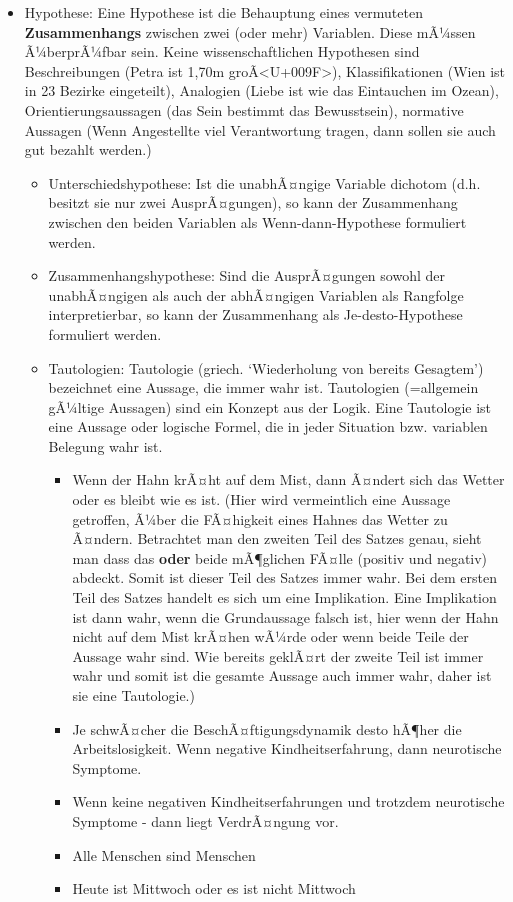 \documentclass[
]{book}
\providecommand{\tightlist}{%
  \setlength{\itemsep}{0pt}\setlength{\parskip}{0pt}}
\begin{document}
\begin{itemize}
\tightlist
\item
  Hypothese: Eine Hypothese ist die Behauptung eines vermuteten \textbf{Zusammenhangs} zwischen zwei (oder mehr) Variablen. Diese mÃ¼ssen Ã¼berprÃ¼fbar sein. Keine wissenschaftlichen Hypothesen sind Beschreibungen (Petra ist 1,70m groÃ\textless U+009F\textgreater), Klassifikationen (Wien ist in 23 Bezirke eingeteilt), Analogien (Liebe ist wie das Eintauchen im Ozean), Orientierungsaussagen (das Sein bestimmt das Bewusstsein), normative Aussagen (Wenn Angestellte viel Verantwortung tragen, dann sollen sie auch gut bezahlt werden.)

  \begin{itemize}
  \tightlist
  \item
    Unterschiedshypothese: Ist die unabhÃ¤ngige Variable dichotom (d.h. besitzt sie nur zwei AusprÃ¤gungen), so kann der Zusammenhang zwischen den beiden Variablen als Wenn-dann-Hypothese formuliert werden.
  \item
    Zusammenhangshypothese: Sind die AusprÃ¤gungen sowohl der unabhÃ¤ngigen als auch der abhÃ¤ngigen Variablen als Rangfolge interpretierbar, so kann der Zusammenhang als Je-desto-Hypothese formuliert werden.
  \item
    Tautologien: Tautologie (griech. `Wiederholung von bereits Gesagtem') bezeichnet eine Aussage, die immer wahr ist. Tautologien (=allgemein gÃ¼ltige Aussagen) sind ein Konzept aus der Logik. Eine Tautologie ist eine Aussage oder logische Formel, die in jeder Situation bzw. variablen Belegung wahr ist.

    \begin{itemize}
    \tightlist
    \item
      Wenn der Hahn krÃ¤ht auf dem Mist, dann Ã¤ndert sich das Wetter oder es bleibt wie es ist. (Hier wird vermeintlich eine Aussage getroffen, Ã¼ber die FÃ¤higkeit eines Hahnes das Wetter zu Ã¤ndern. Betrachtet man den zweiten Teil des Satzes genau, sieht man dass das \textbf{oder} beide mÃ¶glichen FÃ¤lle (positiv und negativ) abdeckt. Somit ist dieser Teil des Satzes immer wahr. Bei dem ersten Teil des Satzes handelt es sich um eine Implikation. Eine Implikation ist dann wahr, wenn die Grundaussage falsch ist, hier wenn der Hahn nicht auf dem Mist krÃ¤hen wÃ¼rde oder wenn beide Teile der Aussage wahr sind. Wie bereits geklÃ¤rt der zweite Teil ist immer wahr und somit ist die gesamte Aussage auch immer wahr, daher ist sie eine Tautologie.)
    \item
      Je schwÃ¤cher die BeschÃ¤ftigungsdynamik desto hÃ¶her die Arbeitslosigkeit. Wenn negative Kindheitserfahrung, dann neurotische Symptome.
    \item
      Wenn keine negativen Kindheitserfahrungen und trotzdem neurotische Symptome - dann liegt VerdrÃ¤ngung vor.
    \item
      Alle Menschen sind Menschen
    \item
      Heute ist Mittwoch oder es ist nicht Mittwoch
    \end{itemize}
  \end{itemize}
\end{itemize}
\end{document}
